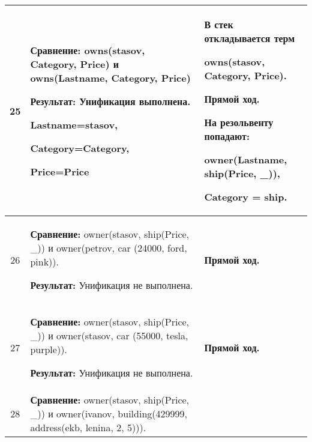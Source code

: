 \begin{longtable}{|c|p{}|p{}|}
25
                       &
\textbf{Сравнение:}\newline
  owns(stasov, Category, Price)
  \newline{}и\newline
  owns(Lastname, Category, Price)
  \newline

  \textbf{Результат:}\newline
  Унификация выполнена.

  Lastname=stasov,

  Category=Category,

  Price=Price
                       &
  В стек откладывается терм

  owns(stasov, Category, Price).
  \newline

  \textbf{Прямой ход.}
  \newline

  На резольвенту попадают:

    owner(Lastname, ship(Price, \_)),

    Category = ship.
                       \\ \hline

26
                       &
\textbf{Сравнение:}\newline
  owner(stasov, ship(Price, \_))
  \newline{}и\newline
  owner(petrov, car     (24000,    ford,    pink)).
  \newline

  \textbf{Результат:}\newline
  Унификация не выполнена.
                       &
  \textbf{Прямой ход.}
                       \\ \hline

27
                       &
\textbf{Сравнение:}\newline
  owner(stasov, ship(Price, \_))
  \newline{}и\newline
  owner(stasov, car     (55000,    tesla,    purple)).
  \newline

  \textbf{Результат:}\newline
  Унификация не выполнена.
                       &
  \textbf{Прямой ход.}
                       \\ \hline

28
                       &
\textbf{Сравнение:}\newline
  owner(stasov, ship(Price, \_))
  \newline{}и\newline
  owner(ivanov, building(429999,   address(ekb, lenina, 2,  5))).
  \newline


\end{longtable}
